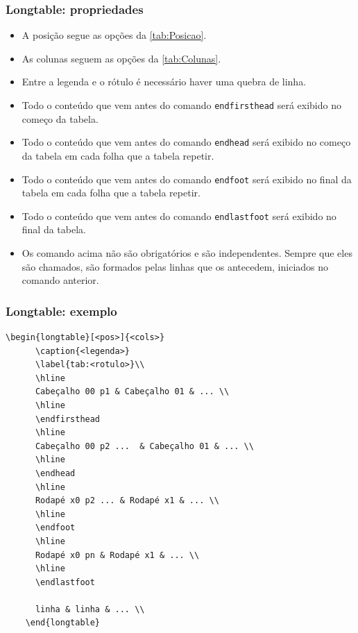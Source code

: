 \documentclass[brazilian]{beamer}
\begin{document}
\begin{frame}[fragile]
  \frametitle{Longtable: propriedades}

  \begin{itemize}
    \item A posição segue as opções da \cref{tab:Posicao}.
    \item As colunas seguem as opções da \cref{tab:Colunas}.
    \item Entre a legenda e o rótulo é necessário haver uma quebra de linha.
    \item Todo o conteúdo que vem antes do comando \lstinline[style=myStyleLatex]!endfirsthead! será exibido no começo da tabela.
    \item Todo o conteúdo que vem antes do comando \lstinline[style=myStyleLatex]!endhead! será exibido no começo da tabela em cada folha que a tabela repetir.
    \item Todo o conteúdo que vem antes do comando \lstinline[style=myStyleLatex]!endfoot! será exibido no final da tabela em cada folha que a tabela repetir.
    \item Todo o conteúdo que vem antes do comando \lstinline[style=myStyleLatex]!endlastfoot! será exibido no final da tabela.
    \item Os comando acima não são obrigatórios e são independentes. Sempre que eles são chamados, são formados pelas linhas que os antecedem, iniciados no comando anterior.
  \end{itemize}

\end{frame}

\begin{frame}[fragile]
  \frametitle{Longtable: exemplo}
  \tiny
  \begin{lstlisting}[style=myStyleLatex]
    \begin{longtable}[<pos>]{<cols>}
      \caption{<legenda>}
      \label{tab:<rotulo>}\\
      \hline
      Cabeçalho 00 p1 & Cabeçalho 01 & ... \\ 
      \hline
      \endfirsthead
      \hline
      Cabeçalho 00 p2 ...  & Cabeçalho 01 & ... \\ 
      \hline 
      \endhead
      \hline
      Rodapé x0 p2 ... & Rodapé x1 & ... \\ 
      \hline
      \endfoot
      \hline
      Rodapé x0 pn & Rodapé x1 & ... \\ 
      \hline
      \endlastfoot
      
      linha & linha & ... \\
    \end{longtable} 
  \end{lstlisting}

\end{frame}
\end{document}
